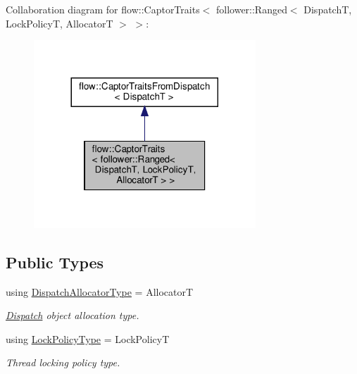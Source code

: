 Collaboration diagram for flow\+:\+:Captor\+Traits$<$ follower\+:\+:Ranged$<$ DispatchT, Lock\+PolicyT, AllocatorT $>$ $>$\+:\nopagebreak
\begin{figure}[H]
\begin{center}
\leavevmode
\includegraphics[width=236pt]{structflow_1_1_captor_traits_3_01follower_1_1_ranged_3_01_dispatch_t_00_01_lock_policy_t_00_01_aaab66a636a15f7367fa8e4790263685a}
\end{center}
\end{figure}
\subsection*{Public Types}
\begin{DoxyCompactItemize}
\item 
\mbox{\label{structflow_1_1_captor_traits_3_01follower_1_1_ranged_3_01_dispatch_t_00_01_lock_policy_t_00_01_allocator_t_01_4_01_4_a9d002c1c7a03bc4f1547f99d3f2e9bf0}} 
using \hyperlink{structflow_1_1_captor_traits_3_01follower_1_1_ranged_3_01_dispatch_t_00_01_lock_policy_t_00_01_allocator_t_01_4_01_4_a9d002c1c7a03bc4f1547f99d3f2e9bf0}{Dispatch\+Allocator\+Type} = AllocatorT
\begin{DoxyCompactList}\small\item\em \hyperlink{classflow_1_1_dispatch}{Dispatch} object allocation type. \end{DoxyCompactList}\item 
\mbox{\label{structflow_1_1_captor_traits_3_01follower_1_1_ranged_3_01_dispatch_t_00_01_lock_policy_t_00_01_allocator_t_01_4_01_4_a9c5ca434efa266dd043e372f29756cdf}} 
using \hyperlink{structflow_1_1_captor_traits_3_01follower_1_1_ranged_3_01_dispatch_t_00_01_lock_policy_t_00_01_allocator_t_01_4_01_4_a9c5ca434efa266dd043e372f29756cdf}{Lock\+Policy\+Type} = Lock\+PolicyT
\begin{DoxyCompactList}\small\item\em Thread locking policy type. \end{DoxyCompactList}\end{DoxyCompactItemize}


